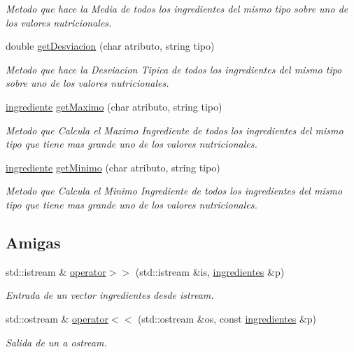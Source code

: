 \begin{DoxyCompactItemize}
\begin{DoxyCompactList}\small\item\em Metodo que hace la Media de todos los ingredientes del mismo tipo sobre uno de los valores nutricionales. \end{DoxyCompactList}\item 
double \hyperlink{classingredientes_adc3f70ae78a02993e6a4b8dac6a4ba07}{get\+Desviacion} (char atributo, string tipo)
\begin{DoxyCompactList}\small\item\em Metodo que hace la Desviacion Tipica de todos los ingredientes del mismo tipo sobre uno de los valores nutricionales. \end{DoxyCompactList}\item 
\hyperlink{classingrediente}{ingrediente} \hyperlink{classingredientes_a6e4cfe264fddd851ccf2f2061d6b66ce}{get\+Maximo} (char atributo, string tipo)
\begin{DoxyCompactList}\small\item\em Metodo que Calcula el Maximo Ingrediente de todos los ingredientes del mismo tipo que tiene mas grande uno de los valores nutricionales. \end{DoxyCompactList}\item 
\hyperlink{classingrediente}{ingrediente} \hyperlink{classingredientes_a0ec4fb15cad1b31709b24751abdf2067}{get\+Minimo} (char atributo, string tipo)
\begin{DoxyCompactList}\small\item\em Metodo que Calcula el Minimo Ingrediente de todos los ingredientes del mismo tipo que tiene mas grande uno de los valores nutricionales. \end{DoxyCompactList}\end{DoxyCompactItemize}
\subsection*{Amigas}
\begin{DoxyCompactItemize}
\item 
std\+::istream \& \hyperlink{classingredientes_adfbb6b2de8bd8b193715a3d58c313b84}{operator$>$$>$} (std\+::istream \&is, \hyperlink{classingredientes}{ingredientes} \&p)
\begin{DoxyCompactList}\small\item\em Entrada de un vector ingredientes desde istream. \end{DoxyCompactList}\item 
std\+::ostream \& \hyperlink{classingredientes_a47b68f377e21ce26320b8adb9c72f347}{operator$<$$<$} (std\+::ostream \&os, const \hyperlink{classingredientes}{ingredientes} \&p)
\begin{DoxyCompactList}\small\item\em Salida de un a ostream. \end{DoxyCompactList}\end{DoxyCompactItemize}


